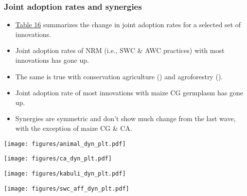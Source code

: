\documentclass[11pt]{beamer}
\begin{document}
\begin{frame}
\label{frthpg}
\frametitle{Joint adoption rates and synergies}
\begin{itemize}

\item  \href{https://docs.google.com/spreadsheets/d/1E5KKmppZlLquxa8B2yMicadECwzf2vcl/edit?usp=sharing&ouid=109547849456599033154&rtpof=true&sd=true}{Table 16} summarizes the change in joint adoption rates for a selected set of innovations. 

\item Joint adoption rates of NRM (i.e., SWC \& AWC practices) with most innovations has gone up. \hyperlink{nrmjointplt}{}

\item The same is true with conservation agriculture (\hyperlink{cajointplt}{}) and agroforestry (\hyperlink{agrfrstjointplt}{}). 

\item Joint adoption rate of most innovations with maize CG germplasm has gone up. \hyperlink{maizejointplt}{}

\item Synergies are symmetric and don't show much change from the last wave, with the exception of maize CG \& CA. \hyperlink{synergydyn}{}

\end{itemize}

\end{frame}



\begin{frame}
\label{animaldynplt}
\texttt{[image: figures/animal\_dyn\_plt.pdf]}
\hyperlink{frstpg}{}
\end{frame}


\begin{frame}
\label{cadynplt}
\texttt{[image: figures/ca\_dyn\_plt.pdf]}
\hyperlink{frstpg}{}
\end{frame}

\begin{frame}
\label{kabulidynplt}
\texttt{[image: figures/kabuli\_dyn\_plt.pdf]}
\hyperlink{frstpg}{}
\end{frame}

\begin{frame}
\label{swcaffdynplt}
\texttt{[image: figures/swc\_aff\_dyn\_plt.pdf]}
\hyperlink{frstpg}{}
\end{frame}
\end{document}
